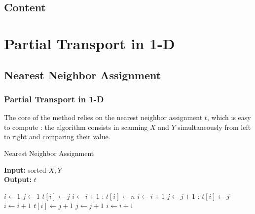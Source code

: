 \documentclass[11pt]{beamer}
\begin{document}

\subsection*{Content}	
	
\begin{frame}
\tableofcontents[]
\end{frame}

\section{Partial Transport in 1-D}

\subsection{Nearest Neighbor Assignment}

\begin{frame}

\frametitle{Partial Transport in 1-D}

The core of the method relies on the {\color{red}nearest neighbor assignment} $t$, which is easy to compute : the algorithm consists in {\color{red} scanning $X$ and $Y$ simultaneously from left to right} and comparing their value.

\begin{algorithm}[H]
\scriptsize
\caption{Nearest Neighbor Assignment}\label{t}
\begin{multicols}{2}
\hspace*{\algorithmicindent} \textbf{Input:} sorted $X,Y$\\
\hspace*{\algorithmicindent} \textbf{Output:} $t$ 
\begin{algorithmic}[2]
\State $i\gets 1$
\State $j\gets 1$
		\State $t[i] \gets j$
		\State $i \gets i+1$
    :
        \State $t[i] \gets n$
        \State $i \gets i+1$
        \State $j \gets j+1$
    :
        \State $t[i] \gets j$
        \State $i \gets i+1$
    \Else
        \State $t[i] \gets j+1$
        \State $j \gets j+1$
        \State $i \gets i+1$
    \EndIf
\EndWhile
\State {}
\end{algorithmic}
\end{multicols}
\end{algorithm}

\end{frame}
\end{document}
